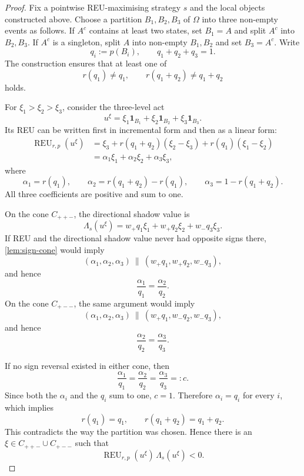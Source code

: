 \documentclass[11pt,a4paper]{article}
\theoremstyle{definition}
\newcommand{\REU}{\operatorname{REU}}
\newcommand{\ind}{\mathbf 1}
\begin{document}
\begin{proof}
Fix a pointwise REU-maximising strategy $s$ and the local objects constructed
above. Choose a partition $B_1,B_2,B_3$ of $\Omega$ into three non-empty
events as follows. If $A^c$ contains at least two states, set $B_1=A$ and
split $A^c$ into $B_2,B_3$. If $A^c$ is a singleton, split $A$ into non-empty
$B_1,B_2$ and set $B_3=A^c$. Write
\[
 q_i:=p(B_i),
 \qquad
 q_1+q_2+q_3=1.
\]
The construction ensures that at least one of
\[
 r(q_1)\neq q_1,
 \qquad
 r(q_1+q_2)\neq q_1+q_2
\]
holds.

For $\xi_1>\xi_2>\xi_3$, consider the three-level act
\[
 u^\xi=\xi_1\ind_{B_1}+\xi_2\ind_{B_2}+\xi_3\ind_{B_3}.
\]
Its REU can be written first in incremental form and then as a linear form:
\begin{align}
 \REU_{r,p}(u^\xi)
 &={}\xi_3+r(q_1+q_2)(\xi_2-\xi_3)+r(q_1)(\xi_1-\xi_2)\nonumber\\
 &=\alpha_1\xi_1+\alpha_2\xi_2+\alpha_3\xi_3,
 \label{eq:three-level-reu}
\end{align}
where
\begin{equation}\label{eq:three-reu-weights}
 \alpha_1=r(q_1),
 \qquad
 \alpha_2=r(q_1+q_2)-r(q_1),
 \qquad
 \alpha_3=1-r(q_1+q_2).
\end{equation}
All three coefficients are positive and sum to one.

On the cone $C_{++-}$, the directional shadow value is
\[
 \Lambda_s(u^\xi)
 =w_+q_1\xi_1+w_+q_2\xi_2+w_-q_3\xi_3.
\]
If REU and the directional shadow value never had opposite signs there,
\cref{lem:sign-cone} would imply
\[
 (\alpha_1,\alpha_2,\alpha_3)
 \ \parallel\
 (w_+q_1,w_+q_2,w_-q_3),
\]
and hence
\begin{equation}\label{eq:first-ratio}
 \frac{\alpha_1}{q_1}=\frac{\alpha_2}{q_2}.
\end{equation}
On the cone $C_{+--}$, the same argument would imply
\[
 (\alpha_1,\alpha_2,\alpha_3)
 \ \parallel\
 (w_+q_1,w_-q_2,w_-q_3),
\]
and hence
\begin{equation}\label{eq:second-ratio}
 \frac{\alpha_2}{q_2}=\frac{\alpha_3}{q_3}.
\end{equation}

If no sign reversal existed in either cone, then
\[
 \frac{\alpha_1}{q_1}
 =\frac{\alpha_2}{q_2}
 =\frac{\alpha_3}{q_3}
 =:c.
\]
Since both the $\alpha_i$ and the $q_i$ sum to one, $c=1$. Therefore
$\alpha_i=q_i$ for every $i$, which implies
\[
 r(q_1)=q_1,
 \qquad
 r(q_1+q_2)=q_1+q_2.
\]
This contradicts the way the partition was chosen. Hence there is an
$\xi\in C_{++-}\cup C_{+--}$ such that
\begin{equation}\label{eq:take-leave-sign-reversal}
 \REU_{r,p}(u^\xi)\,\Lambda_s(u^\xi)<0.
\end{equation}


\end{proof}
\end{document}
